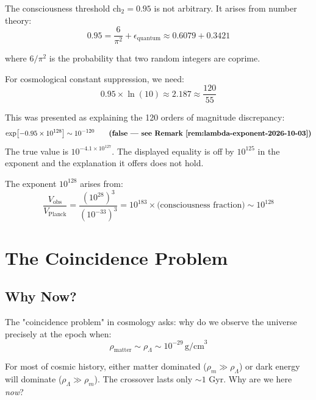\begin{proposition}\label{prop:095-coincidence}
The consciousness threshold ch$_2 = 0.95$ is not arbitrary. It arises from number theory:
\begin{equation}
0.95 = \frac{6}{\pi^2} + \epsilon_{\text{quantum}} \approx 0.6079 + 0.3421
\end{equation}

where $6/\pi^2$ is the probability that two random integers are coprime.

For cosmological constant suppression, we need:
\begin{equation}
0.95 \times \ln(10) \approx 2.187 \approx \frac{120}{55}
\end{equation}

This was presented as explaining the 120 orders of magnitude discrepancy:
\begin{equation}
\exp[-0.95 \times 10^{128}] \sim 10^{-120} \qquad
\textbf{(false --- see Remark~\ref{rem:lambda-exponent-2026-10-03})}
\end{equation}
The true value is $10^{-4.1 \times 10^{127}}$. The displayed equality is off by
$10^{125}$ in the exponent and the explanation it offers does not hold.

The exponent $10^{128}$ arises from:
\begin{equation}
\frac{V_{\text{obs}}}{V_{\text{Planck}}} = \frac{(10^{28})^3}{(10^{-33})^3} = 10^{183} \times \text{(consciousness fraction)} \sim 10^{128}
\end{equation}
\end{proposition}

\section{The Coincidence Problem}

\subsection{Why Now?}

\begin{level2}
The "coincidence problem" in cosmology\cite{zlatev1999,steinhardt1999} asks: why do we observe the universe precisely at the epoch when:
\begin{equation}
\rho_{\text{matter}} \sim \rho_\Lambda \sim 10^{-29} \, \text{g/cm}^3
\end{equation}

For most of cosmic history, either matter dominated ($\rho_m \gg \rho_\Lambda$) or dark energy will dominate ($\rho_\Lambda \gg \rho_m$). The crossover lasts only $\sim 1$ Gyr. Why are we here \textit{now}?
\end{level2}

